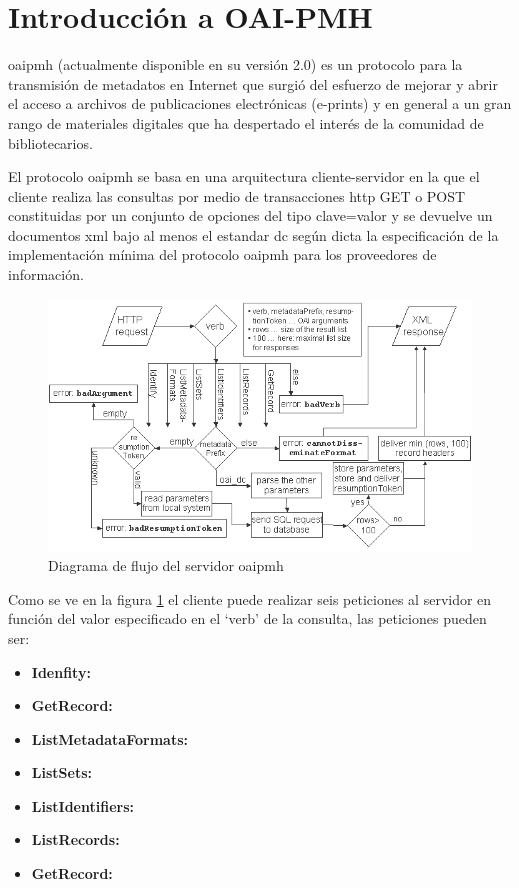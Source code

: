 \section{Introducción a OAI-PMH}

\acrfull{oaipmh} (actualmente disponible en su versión 2.0) es un protocolo para la transmisión de metadatos en Internet que surgió del esfuerzo de mejorar y abrir el acceso a archivos de publicaciones electrónicas (e-prints) y en general a un gran rango de materiales digitales que ha despertado el interés de la comunidad de bibliotecarios.\cite{JM_OAI}

El protocolo \acrshort{oaipmh} se basa en una arquitectura cliente-servidor en la que el cliente realiza las consultas por medio de transacciones \acrshort{http} GET o POST constituidas por un conjunto de opciones del tipo clave=valor y se devuelve un documentos \acrshort{xml} bajo al menos el estandar \acrfull{dc} según dicta la especificación de la implementación mínima del protocolo \acrshort{oaipmh} para los proveedores de información.\cite{OAIPMH_implementers}

\begin{figure}[!htp]
	\centering
	\includegraphics[scale=.5]{fig/oai_flow}
	\caption{Diagrama de flujo del servidor \acrshort{oaipmh}}\label{fig:oaiflow}
\end{figure}

Como se ve en la figura \ref{fig:oaiflow} el cliente puede realizar seis peticiones al servidor en función del valor especificado en el `verb' de la consulta, las peticiones pueden ser:

\begin{itemize}
	\item \textbf{Idenfity:}
	\item \textbf{GetRecord:}
	\item \textbf{ListMetadataFormats:}
	\item \textbf{ListSets:}
	\item \textbf{ListIdentifiers:}
	\item \textbf{ListRecords:}
	\item \textbf{GetRecord:}
\end{itemize}